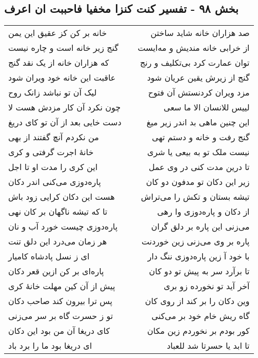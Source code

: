 \begin{center}
\section*{بخش ۹۸ - تفسیر کنت کنزا مخفیا فاحببت ان اعرف}
\label{sec:sh098}
\begin{longtable}{l p{0.5cm} r}
خانه بر کن کز عقیق این یمن
&&
صد هزاران خانه شاید ساختن
\\
گنج زیر خانه است و چاره نیست
&&
از خرابی خانه مندیش و مه‌ایست
\\
که هزاران خانه از یک نقد گنج
&&
توان عمارت کرد بی‌تکلیف و رنج
\\
عاقبت این خانه خود ویران شود
&&
گنج از زیرش یقین عریان شود
\\
لیک آن تو نباشد زانک روح
&&
مزد ویران کردنستش آن فتوح
\\
چون نکرد آن کار مزدش هست لا
&&
لییس للانسان الا ما سعی
\\
دست خایی بعد از آن تو کای دریغ
&&
این چنین ماهی بد اندر زیر میغ
\\
من نکردم آنچ گفتند از بهی
&&
گنج رفت و خانه و دستم تهی
\\
خانهٔ اجرت گرفتی و کری
&&
نیست ملک تو به بیعی یا شری
\\
این کری را مدت او تا اجل
&&
تا درین مدت کنی در وی عمل
\\
پاره‌دوزی می‌کنی اندر دکان
&&
زیر این دکان تو مدفون دو کان
\\
هست این دکان کرایی زود باش
&&
تیشه بستان و تکش را می‌تراش
\\
تا که تیشه ناگهان بر کان نهی
&&
از دکان و پاره‌دوزی وا رهی
\\
پاره‌دوزی چیست خورد آب و نان
&&
می‌زنی این پاره بر دلق گران
\\
هر زمان می‌درد این دلق تنت
&&
پاره بر وی می‌زنی زین خوردنت
\\
ای ز نسل پادشاه کامیار
&&
با خود آ زین پاره‌دوزی ننگ دار
\\
پاره‌ای بر کن ازین قعر دکان
&&
تا برآرد سر به پیش تو دو کان
\\
پیش از آن کین مهلت خانهٔ کری
&&
آخر آید تو نخورده زو بری
\\
پس ترا بیرون کند صاحب دکان
&&
وین دکان را بر کند از روی کان
\\
تو ز حسرت گاه بر سر می‌زنی
&&
گاه ریش خام خود بر می‌کنی
\\
کای دریغا آن من بود این دکان
&&
کور بودم بر نخوردم زین مکان
\\
ای دریغا بود ما را برد باد
&&
تا ابد یا حسرتا شد للعباد
\\
\end{longtable}
\end{center}
